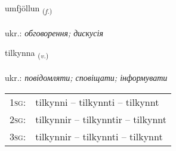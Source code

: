 \documentclass[frontgrid, backgrid]{flacards}\usepackage[]{graphicx}\usepackage[]{xcolor}
\begin{document}
\renewcommand{\flhead}{\vskip5pt \fboxsep=0pt {\small\bfseries\footnotesize Nafnorð | іменник}}
\renewcommand{\fcfoot}{\vskip5pt \fboxsep=0pt \hspace{2pt}{\small\bfseries\footnotesize 1K}}

\renewcommand{\blhead}{\vskip5pt {\small\bfseries\footnotesize Nafnorð | іменник }}
\renewcommand{\bcfoot}{\vskip5pt \hspace{2pt}{\small\bfseries\footnotesize 1K}}


{umfjöllun \small{\textsubscript{(\textit{f.})}} \\[1ex] %
\textphonetic{[ʏmfjœtlʏn]} \\
ukr.: \emph{обговорення; дискусія} \\  [2ex]
\renewcommand*{\arraystretch}{0.8}
}

\renewcommand{\flhead}{\vskip5pt \fboxsep=0pt {\small\bfseries\footnotesize Sagnorð | дієслово}}
\renewcommand{\fcfoot}{\vskip5pt \fboxsep=0pt \hspace{2pt}{\small\bfseries\footnotesize 1K}}

\renewcommand{\blhead}{\vskip5pt {\small\bfseries\footnotesize Sagnorð | дієслово }}
\renewcommand{\bcfoot}{\vskip5pt \hspace{2pt}{\small\bfseries\footnotesize 1K}}


{tilkynna \small{\textsubscript{(\textit{v.})}} \\[1ex] %
\textphonetic{[tʰɪlcʰɪna]} \\
ukr.: \emph{повідомляти; сповіщати; інформувати} \\  [2ex]
\renewcommand*{\arraystretch}{0.8}
\begin{tabular}{p{1cm}l}
\textsc{1sg}: & tilkynni -- tilkynnti -- tilkynnt \\ 
\textsc{2sg}: & tilkynnir -- tilkynntir -- tilkynnt \\ 
\textsc{3sg}: & tilkynnir -- tilkynnti -- tilkynnt \\ 
\end{tabular}
}
\end{document}
